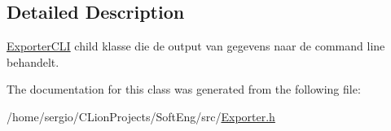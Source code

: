 \subsection{Detailed Description}
\hyperlink{class_exporter_c_l_i}{Exporter\+C\+LI} child klasse die de output van gegevens naar de command line behandelt. 

The documentation for this class was generated from the following file\+:\begin{DoxyCompactItemize}
\item 
/home/sergio/\+C\+Lion\+Projects/\+Soft\+Eng/src/\hyperlink{_exporter_8h}{Exporter.\+h}\end{DoxyCompactItemize}
